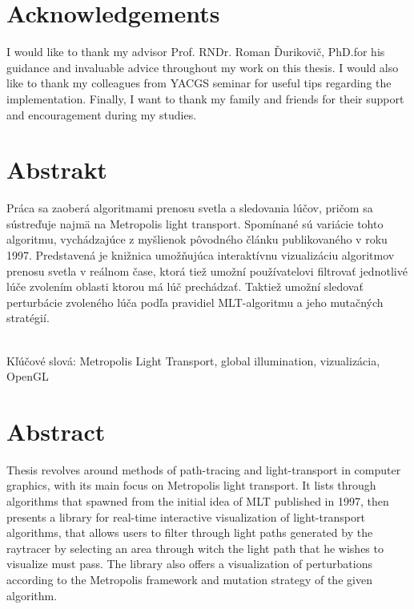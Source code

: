 \documentclass[a4paper,12pt,oneside,final]{memoir}
\def\mfadvisor{Prof. RNDr. Roman Ďurikovič, PhD.}
\def\mfplacedate{Bratislava, 2014}
\begin{document}


%

\chapter*{Acknowledgements}\label{chap:thank_you}
I would like to thank my advisor \mfadvisor for his guidance and invaluable advice throughout my work on this thesis. I would also like to thank my colleagues from YACGS seminar for useful tips regarding the implementation. Finally, I want to thank my family and friends for their support and encouragement during my studies.
\vfill\eject 

\chapter*{Abstrakt}\label{chap:abstract_sk}
Práca sa zaoberá algoritmami prenosu svetla a sledovania lúčov, pričom sa sústreďuje najmä na Metropolis light transport. Spomínané sú variácie tohto algoritmu, vychádzajúce z myšlienok pôvodného článku publikovaného v roku 1997. Predstavená je knižnica umožňujúca interaktívnu vizualizáciu algoritmov prenosu svetla v reálnom čase, ktorá tiež umožní používatelovi filtrovať jednotlivé lúče zvolením oblasti ktorou má lúč prechádzať. Taktiež umožní sledovať perturbácie zvoleného lúča podľa pravidiel MLT-algoritmu a jeho mutačných stratégií.

~\\
Kľúčové slová: Metropolis Light Transport, global illumination, vizualizácia, OpenGL
\vfill\eject 

\chapter*{Abstract}\label{chap:abstract_en}
Thesis revolves around methods of path-tracing and light-transport in computer graphics, with its main focus on Metropolis light transport. It lists through algorithms that spawned from the initial idea of MLT published in 1997, then presents a library for real-time interactive visualization of light-transport algorithms, that allows users to filter through light paths generated by the raytracer by selecting an area through witch the light path that he wishes to visualize must pass. The library also offers a visualization of perturbations according to the Metropolis framework and mutation strategy of the given algorithm.
\end{document}
